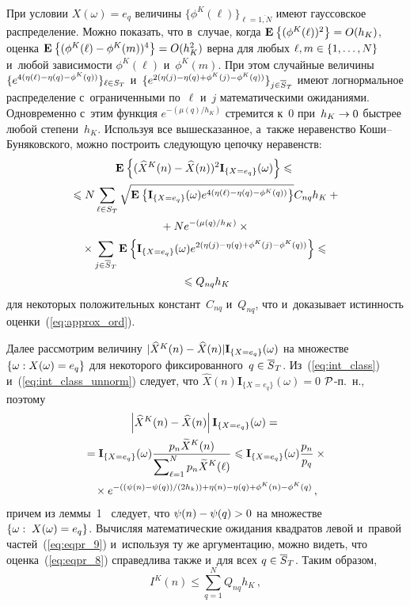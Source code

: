 \begin{multicols}{2}
{\begin{multline*}
 \end{multline*}
 При условии $X(\omega)=e_q$ величины 
 $\{\phi^K(\ell)\}_{\ell=\overline{1,N}}$ имеют гауссовское распределение. 
 Можно показать, что в~случае, когда $\me{}{(\phi^K(\ell))^2}\hm=O(h_K)$, 
 оценка $\me{}{(\phi^K(\ell)\hm-\phi^K(m))^4}\hm=O(h_K^2)$ верна для 
 любых $\ell,m \hm\in \{1,\ldots,N\}$ и~любой зависимости $\phi^K(\ell)$ 
 и~$\phi^K(m)$. При этом случайные величины $\{e^{4(\eta(\ell)\hm-
 \eta(q)-\phi^K(q))}\}_{\ell \in S_T}$ и~$\{e^{2(\eta(j)\hm-
 \eta(q)+\phi^K(j)-\phi^K(q))}\}_{j \in \overline{S}_T}$ имеют 
 логнормальное распределение с~ограниченными по~$\ell$ и~$j$ математическими 
 ожиданиями. Одновременно с~этим функция $e^{-({\mu(q)}/{h_K})}$ стремится к~0 
 при~$h_K \hm\to 0$ быстрее любой степени~$h_K$. Используя все вышесказанное, 
 а~также неравенство Ко\-ши--Бу\-ня\-ков\-ско\-го, 
 можно построить следующую цепочку неравенств:
  \begin{multline}
\mathbf{E}_{  }\left\{ \mathop{(\widehat{X}^K(n)-\widehat{X}(n))^2\mathbf{I}_{\{X=e_q\}}(\omega)} \right\} 
\leqslant {}\\[1pt] 
{}\leqslant
N \sum\limits_{\ell \in S_T}
\sqrt{
\mathbf{E}_{  }\left\{ \mathop{\mathbf{I}_{\{X=e_q\}}(\omega)e^{4(\eta(\ell)-\eta(q)-\phi^K(q))}} \right\}} 
C_{nq}h_K+{}\\[1pt]
{}+
Ne^{-({\mu(q)}/{h_K})}\times{}\\[1pt]
{}\times \sum\limits_{j \in \overline{S}_T}\mathbf{E}_{  }\left\{ \mathop{\mathbf{I}_{\{X=e_q\}}
(\omega)e^{2(\eta(j)-\eta(q)+\phi^K(j)-\phi^K(q))}} \right\} \leqslant{}\\[1pt]
{}\leqslant Q_{nq}h_K
\label{eq:eqpr_8}
 \end{multline}
 для некоторых положительных констант~$C_{nq}$ и~$Q_{nq}$,
  что и~доказывает истинность оценки~(\ref{eq:approx_ord}).

  Далее рассмотрим величину $|\widehat{X}^K(n)\hm-\widehat{X}(n)|\mathbf{I}_{\{X=e_q\}}
  (\omega)$ на множестве $\{\omega: X(\omega)\hm=e_q\}$ для некоторого 
  фиксированного~$q \hm\in \overline{S}_T$. Из~(\ref{eq:int_class}) 
  и~(\ref{eq:int_class_unnorm}) следует, что $\widehat{X}(n)\mathbf{I}_{\{X=e_q\}}
  (\omega)=0$ ${\mathcal P}$-п.~н., поэтому
    \begin{multline}
\left\vert \widehat{X}^K(n)-\widehat{X}(n)\right\vert\mathbf{I}_{\{X=e_q\}}(\omega) ={}\\[1pt]
{}=
\mathbf{I}_{\{X=e_q\}}(\omega)
\displaystyle\frac{\displaystyle p_n\widetilde{X}^K(n)\mathstrut}{\displaystyle \sum\nolimits_{\ell=1}^Np_n\widetilde{X}^K(\ell)\mathstrut} \leqslant
\mathbf{I}_{\{X=e_q\}}(\omega) \displaystyle\frac{\displaystyle p_n\mathstrut}{\displaystyle p_q\mathstrut}\times{}\\[1pt]
{}\times
e^{-(({\psi(n)-\psi(q)})/({2h_k}))+\eta(n)-\eta(q)+\phi^K(n)-\phi^K(q)}\,,
\label{eq:eqpr_9}
 \end{multline}
причем из леммы~1~\cite{B_17} следует, что $\psi(n)\hm-\psi(q)\hm>0$ на 
множестве $\{\omega:\;X(\omega)\hm=e_q\}$. Вычисляя математические ожидания квадратов 
левой и~правой частей~(\ref{eq:eqpr_9}) и~используя ту же аргументацию, 
можно видеть, что оценка~(\ref{eq:eqpr_8}) справедлива также и~для всех $q \hm\in 
\overline{S}_T$. Таким образом,
\begin{equation*}
I^K(n) \leqslant \sum\limits_{q=1}^N
Q_{nq}h_K\,,
\end{equation*}

}
\end{multicols}
